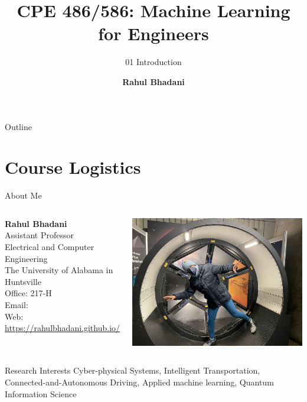 \documentclass[aspectratio=169,xcolor=dvipsnames,svgnames,x11names,fleqn]{beamer}
\title[CPE 486/586: Machine Learning]{CPE 486/586: Machine Learning for Engineers} %
\subtitle{01 Introduction}
\author[Rahul Bhadani] {{\Large \textbf{Rahul Bhadani}}}
\institute[UAH] %
{
    Electrical \& Computer Engineering,  The University of Alabama in Huntsville
}
\date
\begin{document}
\begin{frame}
  \titlepage
\end{frame}

\begin{frame}{Outline}
   \tableofcontents
\end{frame}

\section{Course Logistics}

\begin{frame}{About Me}
    \begin{columns}[c] %

        \textbf{Rahul Bhadani} \\
        Assistant Professor \\
        Electrical and Computer Engineering \\
        The University of Alabama in Huntsville \\
        Office: 217-H \\
        Email: {\color{MediumRed}{rahul.bhadani@uah.edu}} \\
        Web: {\color{MediumRed}\url{https://rahulbhadani.github.io/}}

        \includegraphics[width=.89\textwidth]{figures/intro_rkb.jpg}
    \end{columns}
    
    \begin{block}{Research Interests}
    Cyber-physical Systems,
    Intelligent Transportation, 
    Connected-and-Autonomous Driving, 
    Applied machine learning,
    Quantum Information Science
    \end{block}
\end{frame}
\end{document}
